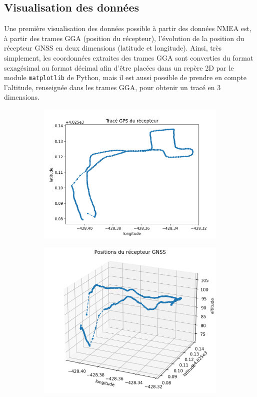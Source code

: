    \subsection{Visualisation des données}\label{subsec:visualisation-des-donnees}
      Une première visualisation des données possible à partir des données NMEA est, à partir des trames GGA (position du récepteur), l'évolution de la position du récepteur GNSS en deux dimensions (latitude et longitude).
      Ainsi, très simplement, les coordonnées extraites des trames GGA sont converties du format sexagésimal au format décimal afin d'être placées dans un repère 2D par le module \texttt{matplotlib} de Python, mais il est aussi possible de prendre en compte l'altitude, renseignée dans les trames GGA, pour obtenir un tracé en 3 dimensions.

      \begin{figure}[h]
          \centering
          \begin{subfigure}[h]{.45\textwidth}
             \centering
             \includegraphics[width=\textwidth]{imgs/coords_2d}
          \end{subfigure}
          \hfill
          \begin{subfigure}[h]{.45\textwidth}
             \centering
             \includegraphics[width=\textwidth]{imgs/coords_3d}

\end{subfigure}
\end{figure}
